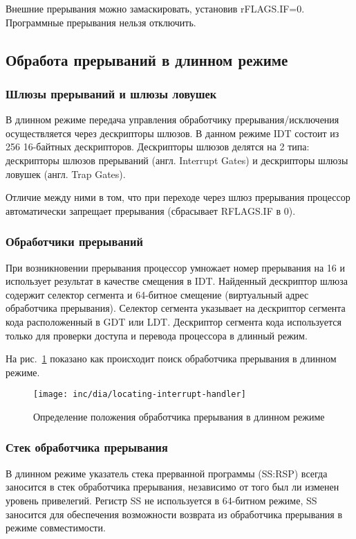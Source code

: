 Внешние прерывания можно замаскировать, установив rFLAGS.IF=0. Программные
прерывания нельзя отключить.

\subsection{Обработа прерываний в длинном режиме}
\subsubsection*{Шлюзы прерываний и шлюзы ловушек}
В длинном режиме передача управления обработчику прерывания/исключения
осуществляется через дескрипторы шлюзов. В данном режиме IDT состоит из 256
16-байтных дескрипторов. Дескрипторы шлюзов делятся на 2 типа: дескрипторы шлюзов
прерываний (англ. Interrupt Gates) и дескрипторы шлюзы ловушек (англ. Trap Gates).

Отличие между ними в том, что при переходе через шлюз прерывания процессор
автоматически запрещает прерывания (сбрасывает RFLAGS.IF в 0).

\subsubsection*{Обработчики прерываний}
При возникновении прерывания процессор умножает номер прерывания на 16 и
использует результат в качестве смещения в IDT. Найденный дескриптор шлюза
содержит селектор сегмента и 64-битное смещение (виртуальный адрес обработчика
прерывания). Селектор сегмента указывает на дескриптор сегмента кода
расположенный в GDT или LDT. Дескриптор сегмента кода используется только для
проверки доступа и перевода процессора в длинный режим.

На рис.~\ref{fig:locating_interrupt_handler} показано как происходит поиск
обработчика прерывания в длинном режиме.

\begin{figure}[ht!]
  \centering
  \texttt{[image: inc/dia/locating-interrupt-handler]}
  \caption{Определение положения обработчика прерывания в длинном режиме}
  \label{fig:locating_interrupt_handler}
\end{figure}


\subsubsection*{Стек обработчика прерывания}
В длинном режиме указатель стека прерванной программы (SS:RSP) всегда заносится в
стек обработчика прерывания, независимо от того был ли изменен уровень
привелегий. Регистр SS не используется в 64-битном режиме, SS заносится для
обеспечения возможности возврата из обработчика прерывания в режиме
совместимости.

